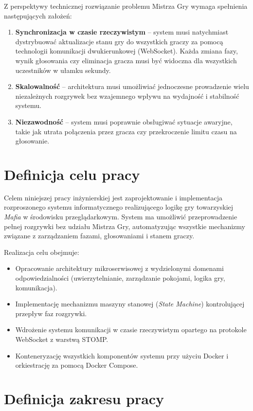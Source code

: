 ﻿\documentclass[a4paper,twoside,11pt]{mwrep}
\theoremstyle{plain} \newtheorem{thm}{Twierdzenie}
\theoremstyle{plain} \newtheorem{lem}{Lemat}
\theoremstyle{definition} \newtheorem{defn}{Definicja}
\theoremstyle{remark} \newtheorem*{rem}{Wniosek}
\begin{document}
Z perspektywy technicznej rozwiązanie problemu Mistrza Gry wymaga spełnienia następujących założeń:

\begin{enumerate}
    \item \textbf{Synchronizacja w czasie rzeczywistym} -- system musi natychmiast dystrybuować aktualizacje stanu gry do wszystkich graczy za pomocą technologii komunikacji dwukierunkowej (WebSocket). Każda zmiana fazy, wynik głosowania czy eliminacja gracza musi być widoczna dla wszystkich uczestników w ułamku sekundy.
    
    \item \textbf{Skalowalność} -- architektura musi umożliwiać jednoczesne prowadzenie wielu niezależnych rozgrywek bez wzajemnego wpływu na wydajność i stabilność systemu.
    
    \item \textbf{Niezawodność} -- system musi poprawnie obsługiwać sytuacje awaryjne, takie jak utrata połączenia przez gracza czy przekroczenie limitu czasu na głosowanie.
\end{enumerate}
\section{Definicja celu pracy}

Celem niniejszej pracy inżynierskiej jest zaprojektowanie i implementacja rozproszonego systemu informatycznego realizującego logikę gry towarzyskiej \textit{Mafia} w środowisku przeglądarkowym. System ma umożliwić przeprowadzenie pełnej rozgrywki bez udziału Mistrza Gry, automatyzując wszystkie mechanizmy związane z zarządzaniem fazami, głosowaniami i stanem graczy.

Realizacja celu obejmuje:
\begin{itemize}
    \item Opracowanie architektury mikroserwisowej z wydzielonymi domenami odpowiedzialności (uwierzytelnianie, zarządzanie pokojami, logika gry, komunikacja).
    \item Implementację mechanizmu maszyny stanowej (\textit{State Machine}) kontrolującej przepływ faz rozgrywki.
    \item Wdrożenie systemu komunikacji w czasie rzeczywistym opartego na protokole WebSocket z warstwą STOMP.
    \item Konteneryzację wszystkich komponentów systemu przy użyciu Docker i orkiestrację za pomocą Docker Compose.
\end{itemize}
\section{Definicja zakresu pracy}
\end{document}
